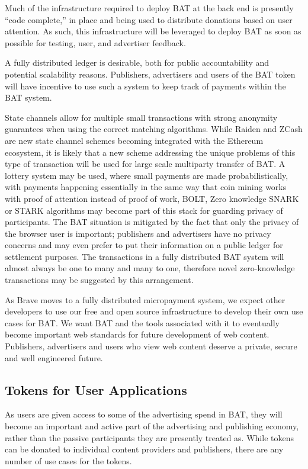 \documentclass[11pt]{article}
\begin{document}
Much of the infrastructure required to deploy BAT at the back end is presently “code complete,” in place and being used to distribute donations based on user attention. As such, this infrastructure will be leveraged to deploy BAT as soon as possible for testing, user, and advertiser feedback.

A fully distributed ledger is desirable, both for public accountability and potential scalability reasons. Publishers, advertisers and users of the BAT token will have incentive to use such a system to keep track of payments within the BAT system. 

State channels allow for multiple small transactions with strong anonymity guarantees when using the correct matching algorithms. While Raiden and ZCash are new state channel schemes becoming integrated with the Ethereum ecosystem, it is likely that a new scheme addressing the unique problems of this type of transaction will be used for large scale multiparty transfer of BAT.
 A lottery system may be used, where small payments are made probabilistically, with payments happening essentially in the same way that coin mining works with proof of attention instead of proof of work\cite{14,15}, BOLT\cite{16}, Zero knowledge SNARK\cite{17} or STARK\cite{18} algorithms may become part of this stack for guarding privacy of participants. The BAT situation is mitigated by the fact that only the privacy of the browser user is important; publishers and advertisers have no privacy concerns and may even prefer to put their information on a public ledger for settlement purposes. The transactions in a fully distributed BAT system will almost always be one to many and many to one, therefore novel zero-knowledge transactions may be suggested by this arrangement.

As Brave moves to a fully distributed micropayment system, we expect other developers to use our free and open source infrastructure to develop their own use cases for BAT. We want BAT and the tools associated with it to eventually become important web standards for future development of web content. Publishers, advertisers and users who view web content deserve a private, secure and well engineered future.
\subsection{Tokens for User Applications}
\label{sec-4-4}

As users are given access to some of the advertising spend in BAT, they will become an important and active part of the advertising and publishing economy, rather than the passive participants they are presently treated as. While tokens can be donated to individual content providers and publishers, there are any number of use cases for the tokens.
\end{document}
